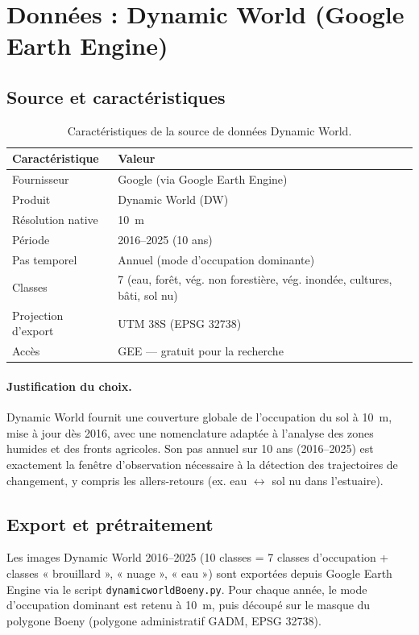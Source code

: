 \section{Données : Dynamic World (Google Earth Engine)}

\subsection{Source et caractéristiques}

\begin{table}[H]
\centering
\caption{Caractéristiques de la source de données Dynamic World.}
\label{tab:caracteristiques_dynamicworld}
\begin{tabular}{ll}
\toprule
\textbf{Caractéristique} & \textbf{Valeur} \\
\midrule
Fournisseur & Google (via Google Earth Engine) \\
Produit & Dynamic World (DW) \\
Résolution native & \SI{10}{\metre} \\
Période & 2016--2025 (10 ans) \\
Pas temporel & Annuel (mode d'occupation dominante) \\
Classes & 7 (eau, forêt, vég. non forestière, vég. inondée, cultures, bâti, sol nu) \\
Projection d'export & UTM 38S (EPSG 32738) \\
Accès & GEE — gratuit pour la recherche \\
\bottomrule
\end{tabular}
\end{table}

\paragraph{Justification du choix.} Dynamic World fournit une couverture
globale de l'occupation du sol à \SI{10}{\metre}, mise à jour dès 2016, avec
une nomenclature adaptée à l'analyse des zones humides et des fronts agricoles.
Son pas annuel sur 10 ans (2016--2025) est exactement la fenêtre d'observation
nécessaire à la détection des trajectoires de changement, y compris les
allers-retours (ex. eau $\leftrightarrow$ sol nu dans l'estuaire).

\subsection{Export et prétraitement}

Les images Dynamic World 2016--2025 (10 classes = 7 classes d'occupation +
classes « brouillard », « nuage », « eau ») sont exportées depuis Google Earth
Engine via le script \texttt{dynamicworldBoeny.py}. Pour chaque année, le mode
d'occupation dominant est retenu à \SI{10}{\metre}, puis découpé sur le masque
du polygone Boeny (polygone administratif GADM, EPSG 32738).

